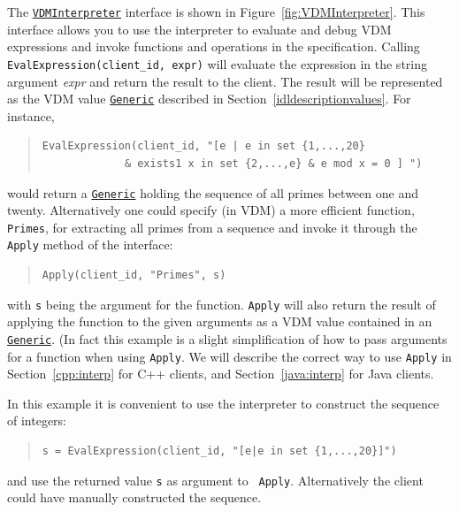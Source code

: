 \documentclass[\pformat,12pt]{article}
\newcommand{\Generic}{\hyperlink{interface.Generic}{Generic}}
\newcommand{\VDMInterpreter}{\hyperlink{interface.VDMInterpreter}{VDMInterpreter}}
\begin{document}
The {\tt \VDMInterpreter} interface is shown in
Figure~\ref{fig:VDMInterpreter}. This interface allows you to use the
interpreter to evaluate and debug VDM expressions and invoke functions and
operations in the specification. Calling {\tt EvalExpression(client\_id, expr)}
will evaluate the expression in the string argument {\em expr} and
return the result to the client. The result will be represented as the
VDM value {\tt \Generic} described in
Section~\ref{idldescriptionvalues}. For instance,

\newpage
\begin{quote}
\begin{verbatim}    
EvalExpression(client_id, "[e | e in set {1,...,20} 
             & exists1 x in set {2,...,e} & e mod x = 0 ] ")
\end{verbatim}
\end{quote}

would return a {\tt \Generic} holding the sequence of all primes
between one and twenty. 
Alternatively one could specify (in VDM) a more efficient function,
{\tt Primes}, for extracting all primes from a sequence and invoke it
through the {\tt Apply} method of the interface: 

\begin{quote}
\begin{verbatim}    
Apply(client_id, "Primes", s)
\end{verbatim}
\end{quote}

with {\tt s} being the argument for the function. {\tt Apply} will
also return the result of applying the function to the given arguments
as a VDM value contained in an {\tt \Generic}. 
(In fact this example is a slight simplification of how to pass 
arguments for a function when using {\tt Apply}. 
We  will describe the correct way to use {\tt Apply} in Section~\ref{cpp:interp} 
for C++ clients, and Section~\ref{java:interp} for Java clients.

In this example it is convenient to use the interpreter to construct
the sequence of integers: 

\begin{quote}
\begin{verbatim}    
s = EvalExpression(client_id, "[e|e in set {1,...,20}]")
\end{verbatim}
\end{quote}

and use the returned value {\tt s} as argument to {\tt
  Apply}. Alternatively the client could have manually constructed the
sequence. 
\end{document}
